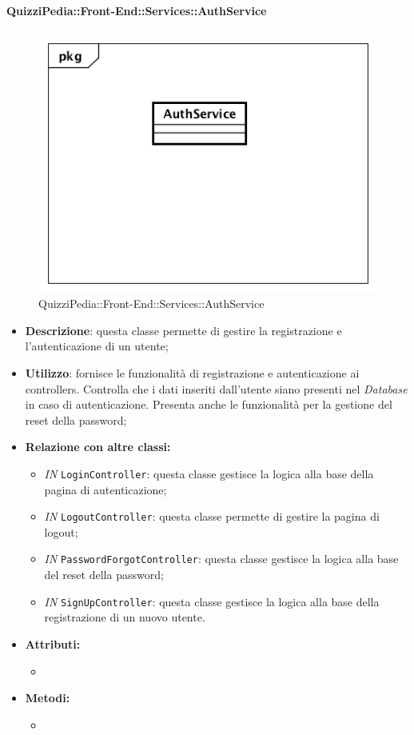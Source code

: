 \paragraph{QuizziPedia::Front-End::Services::AuthService}
\begin{figure}
	\centering
	\includegraphics[scale=0.45]{UML/Classi/Front-End/QuizziPedia_Front-end_Services_ AuthService.png}
	\caption{QuizziPedia::Front-End::Services::AuthService}
\end{figure}
\begin{itemize}
	\item \textbf{Descrizione}: questa classe permette di gestire la registrazione e l'autenticazione di un utente;
	\item \textbf{Utilizzo}: fornisce le funzionalità di registrazione e autenticazione ai controllers. Controlla che i dati inseriti dall'utente siano presenti nel \textit{Database} in caso di autenticazione. Presenta anche le funzionalità per la gestione del reset della password;
	\item \textbf{Relazione con altre classi:}
	\begin{itemize}
		\item \textit{IN} \texttt{LoginController}: questa classe gestisce la logica alla base della pagina di autenticazione;
		\item \textit{IN} \texttt{LogoutController}: questa classe permette di gestire la pagina di logout;
		\item \textit{IN} \texttt{PasswordForgotController}: questa classe gestisce la logica alla base del reset della password;
		\item \textit{IN} \texttt{SignUpController}: questa classe gestisce la logica alla base della registrazione di un nuovo utente.
	\end{itemize}
	\item \textbf{Attributi:}
	\begin{itemize}
		\item 
	\end{itemize}
	\item \textbf{Metodi:}
	\begin{itemize}
		\item 
	\end{itemize}
\end{itemize}

